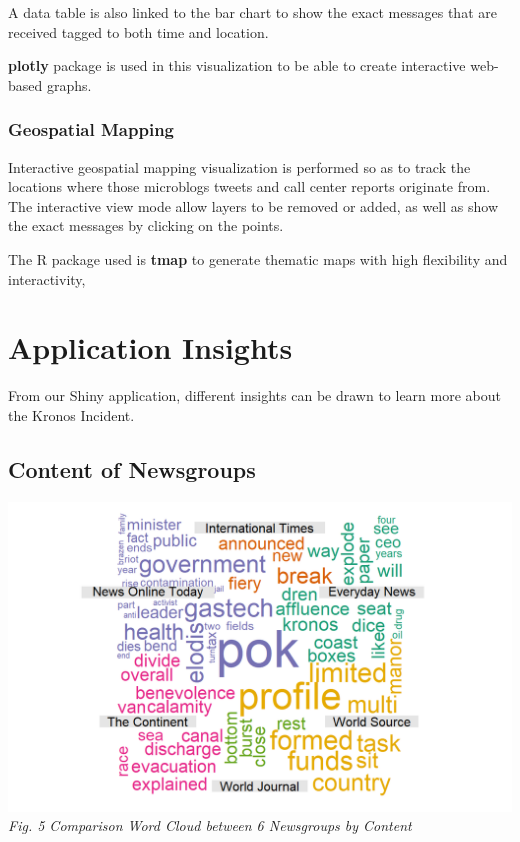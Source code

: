 \documentclass{acm_proc_article-sp}
\begin{document}
A data table is also linked to the bar chart to show the exact messages
that are received tagged to both time and location.

\textbf{plotly} package is used in this visualization to be able to
create interactive web-based graphs.

\hypertarget{geospatial-mapping}{%
\subsubsection{Geospatial Mapping}\label{geospatial-mapping}}

Interactive geospatial mapping visualization is performed so as to track
the locations where those microblogs tweets and call center reports
originate from. The interactive view mode allow layers to be removed or
added, as well as show the exact messages by clicking on the points.

The R package used is \textbf{tmap} to generate thematic maps with high
flexibility and interactivity,

\hypertarget{application-insights}{%
\section{Application Insights}\label{application-insights}}

From our Shiny application, different insights can be drawn to learn
more about the Kronos Incident.

\hypertarget{content-of-newsgroups}{%
\subsection{Content of Newsgroups}\label{content-of-newsgroups}}

\includegraphics{img/image03.png} \emph{Fig. 5 Comparison Word Cloud
between 6 Newsgroups by Content}
\end{document}
